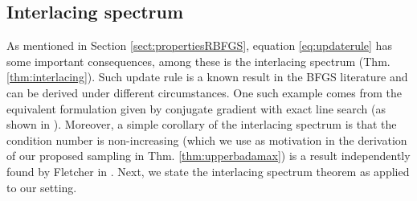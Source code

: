 \documentclass[12pt,conference,compsocconf]{IEEEtran}
\begin{document}
\subsection{Interlacing spectrum}\label{sect:interlacing}
As mentioned in Section \ref{sect:propertiesRBFGS}, equation \eqref{eq:updaterule} has some important consequences, among these is the interlacing spectrum (Thm. \ref{thm:interlacing}). Such update rule is a known result in the BFGS literature and can be derived under different circumstances. One such example comes from the equivalent formulation given by conjugate gradient with exact line search (as shown in \cite{Nazareth}). Moreover, a simple corollary of the interlacing spectrum is that the condition number is non-increasing (which we use as motivation in the derivation of our proposed sampling in Thm. \ref{thm:upperbadamax}) is a result independently found by Fletcher in \cite{Fletcher}.
Next, we state the interlacing spectrum theorem as applied to our setting.
\end{document}
